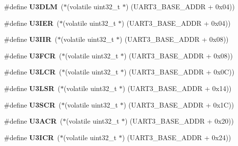 \begin{DoxyCompactItemize}
\#define {\bfseries U3\+D\+LM}~($\ast$(volatile uint32\+\_\+t $\ast$) (U\+A\+R\+T3\+\_\+\+B\+A\+S\+E\+\_\+\+A\+D\+DR + 0x04))
\item 
\mbox{\label{group__lpc24xx__regs_gaa47e28445b2880d9af074a1b760a1bda}} 
\#define {\bfseries U3\+I\+ER}~($\ast$(volatile uint32\+\_\+t $\ast$) (U\+A\+R\+T3\+\_\+\+B\+A\+S\+E\+\_\+\+A\+D\+DR + 0x04))
\item 
\mbox{\label{group__lpc24xx__regs_ga711fa9ccc09097da604981ca39da9713}} 
\#define {\bfseries U3\+I\+IR}~($\ast$(volatile uint32\+\_\+t $\ast$) (U\+A\+R\+T3\+\_\+\+B\+A\+S\+E\+\_\+\+A\+D\+DR + 0x08))
\item 
\mbox{\label{group__lpc24xx__regs_ga45baee27af392ba026b80b0dea3b8000}} 
\#define {\bfseries U3\+F\+CR}~($\ast$(volatile uint32\+\_\+t $\ast$) (U\+A\+R\+T3\+\_\+\+B\+A\+S\+E\+\_\+\+A\+D\+DR + 0x08))
\item 
\mbox{\label{group__lpc24xx__regs_gac72d3bbaccc4015017322aa7c8679a9d}} 
\#define {\bfseries U3\+L\+CR}~($\ast$(volatile uint32\+\_\+t $\ast$) (U\+A\+R\+T3\+\_\+\+B\+A\+S\+E\+\_\+\+A\+D\+DR + 0x0\+C))
\item 
\mbox{\label{group__lpc24xx__regs_gae390f9197ac4478cdadcf348061b1025}} 
\#define {\bfseries U3\+L\+SR}~($\ast$(volatile uint32\+\_\+t $\ast$) (U\+A\+R\+T3\+\_\+\+B\+A\+S\+E\+\_\+\+A\+D\+DR + 0x14))
\item 
\mbox{\label{group__lpc24xx__regs_ga0a656ba5f9f0597f4e0f3e4ed4826d89}} 
\#define {\bfseries U3\+S\+CR}~($\ast$(volatile uint32\+\_\+t $\ast$) (U\+A\+R\+T3\+\_\+\+B\+A\+S\+E\+\_\+\+A\+D\+DR + 0x1\+C))
\item 
\mbox{\label{group__lpc24xx__regs_gac46bae7d649e92e19f364e1f15722dcf}} 
\#define {\bfseries U3\+A\+CR}~($\ast$(volatile uint32\+\_\+t $\ast$) (U\+A\+R\+T3\+\_\+\+B\+A\+S\+E\+\_\+\+A\+D\+DR + 0x20))
\item 
\mbox{\label{group__lpc24xx__regs_gaa3f6aa46c34e9a05e79ab9f31554369f}} 
\#define {\bfseries U3\+I\+CR}~($\ast$(volatile uint32\+\_\+t $\ast$) (U\+A\+R\+T3\+\_\+\+B\+A\+S\+E\+\_\+\+A\+D\+DR + 0x24))

\end{DoxyCompactItemize}
